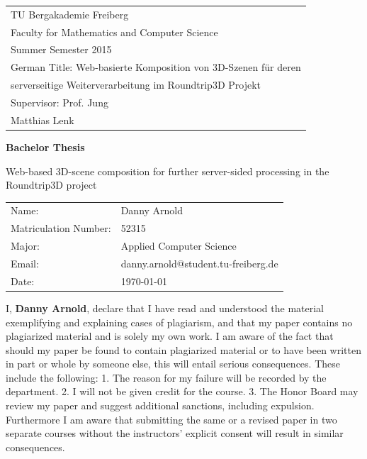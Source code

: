 \documentclass[
	 11pt,         %
	 a4paper,      %
	 oneside,
	 ]{article}
\newcommand{\mytitle}{Web-based 3D-scene composition for further server-sided processing in the Roundtrip3D project}
\newcommand{\myauthor}{Danny Arnold}
\newcommand{\myseminar}{Web-basierte Komposition von 3D-Szenen für deren}
\newcommand{\mydozent}{Prof. Jung}
\newcommand{\mydozentTwo}{Matthias Lenk}
\newcommand{\myseminarTwo}{serverseitige Weiterverarbeitung im Roundtrip3D Projekt}
\newcommand{\mysemester}{Summer Semester 2015}
\newcommand{\emptypage}[0]{
	\clearpage
	\thispagestyle{empty}
	\mbox{}
	\newpage
}
\begin{document}
\begin{titlepage}
\begin{tabular}[l]{l}
TU Bergakademie Freiberg\\
Faculty for Mathematics and Computer Science\\
\mysemester\\
German Title: \myseminar\\
\phantom{German Title: }\myseminarTwo\\
Supervisor: \mydozent\\
\phantom{Supervisor: }\mydozentTwo\\
\end{tabular}

\vspace{4cm}
\begin{center}
\textbf{\large Bachelor Thesis} %
\vspace{0.5\baselineskip}

{\huge
\mytitle
}
\end{center}

\vfill
\begin{tabular}[l]{ll}
Name:           & \myauthor\\
Matriculation Number: & 52315\\
Major:    & Applied Computer Science\\
Email: & danny.arnold@student.tu-freiberg.de\\
Date: & \today \\
\end{tabular}

\end{titlepage}
\newpage

\emptypage

\onehalfspacing


\thispagestyle{empty}
\vspace*{100pt}
I, \textbf{\myauthor}, declare that I have read and understood
the material exemplifying and explaining cases of plagiarism, and that my paper contains no plagiarized
material and is solely my own work. I am aware of the fact that should my paper be found to
contain plagiarized material or to have been written in part or whole by someone else, this will
entail serious consequences. These include the following:
1. The reason for my failure will be recorded by the department.
2. I will not be given credit for the course.
3. The Honor Board may review my paper and suggest additional sanctions, including
expulsion.
Furthermore I am aware that submitting the same or a revised paper in two separate courses without
the instructors' explicit consent will result in similar consequences.\cite{Antiplagiatserklrung}
\vspace*{50pt}
\end{document}
